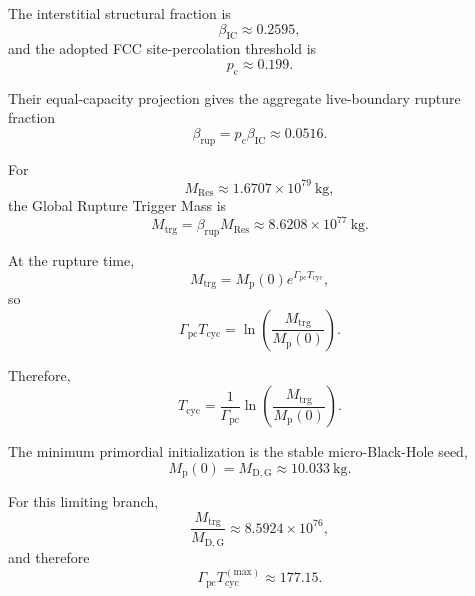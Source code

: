 The interstitial structural fraction is
\begin{equation}
    \beta_{\mathrm{IC}}
    \approx
    0.2595,
\end{equation}
and the adopted FCC site-percolation threshold is
\begin{equation}
    p_{\mathrm c}
    \approx
    0.199.
\end{equation}

Their equal-capacity projection gives the aggregate live-boundary rupture fraction
\begin{equation}
    \beta_{\mathrm{rup}}
    =
    p_{\mathrm c}\beta_{\mathrm{IC}}
    \approx
    0.0516.
\end{equation}

For
\begin{equation}
    M_{\mathrm{Res}}
    \approx
    1.6707\times10^{79}\ \mathrm{kg},
\end{equation}
the Global Rupture Trigger Mass is
\begin{equation}
    M_{\mathrm{trg}}
    =
    \beta_{\mathrm{rup}}M_{\mathrm{Res}}
    \approx
    8.6208\times10^{77}\ \mathrm{kg}.
\end{equation}

At the rupture time,
\begin{equation}
    M_{\mathrm{trg}}
    =
    M_{\mathrm p}(0)
    e^{\Gamma_{\mathrm{pc}}T_{\mathrm{cyc}}},
\end{equation}
so
\begin{equation}
    \Gamma_{\mathrm{pc}}T_{\mathrm{cyc}}
    =
    \ln\left(
        \frac{M_{\mathrm{trg}}}
        {M_{\mathrm p}(0)}
    \right).
\end{equation}

Therefore,
\begin{equation}
    T_{\mathrm{cyc}}
    =
    \frac{1}{\Gamma_{\mathrm{pc}}}
    \ln\left(
        \frac{M_{\mathrm{trg}}}
        {M_{\mathrm p}(0)}
    \right).
\end{equation}

The minimum primordial initialization is the stable micro-Black-Hole seed,
\begin{equation}
    M_{\mathrm p}(0)
    =
    M_{\mathrm{D,G}}
    \approx
    10.033\ \mathrm{kg}.
\end{equation}

For this limiting branch,
\begin{equation}
    \frac{M_{\mathrm{trg}}}
    {M_{\mathrm{D,G}}}
    \approx
    8.5924\times10^{76},
\end{equation}
and therefore
\begin{equation}
    \Gamma_{\mathrm{pc}}
    T_{\mathrm{cyc}}^{(\mathrm{max})}
    \approx
    177.15.
\end{equation}

